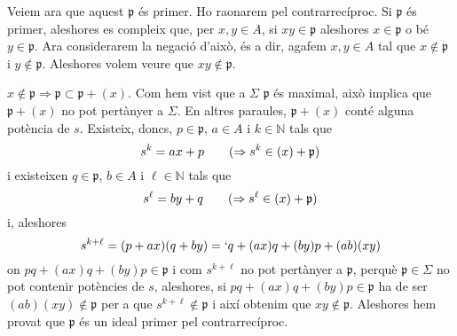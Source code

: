 \documentclass[../main.tex]{subfiles}
\begin{document}
\begin{sol}
\begin{enumerate}[(a)]
    Veiem ara que aquest $\mathfrak{p}$ és primer. Ho raonarem pel contrarrecíproc. Si $\mathfrak{p}$ és primer, aleshores es compleix que, per $x,y\in A$, si $xy\in\mathfrak{p}$ aleshores $x\in\mathfrak{p}$ o bé $y\in\mathfrak{p}$. Ara considerarem la negació d'això, és a dir, agafem $x,y\in A$ tal que $x\not\in \mathfrak{p}$ i $y\not\in\mathfrak{p}$. Aleshores volem veure que $xy\not\in\mathfrak{p}$.
    
    $x\not\in\mathfrak{p}\Rightarrow \mathfrak{p}\subset \mathfrak{p}+(x)$. Com hem vist que a $\Sigma$ $\mathfrak{p}$ és maximal, això implica que $\mathfrak{p}+(x)$ no pot pertànyer a $\Sigma$. En altres paraules, $\mathfrak{p}+(x)$ conté alguna potència de $s$. Existeix, doncs, $p\in\mathfrak{p}$, $a\in A$ i $k\in\mathbb{N}$ tals que
    \begin{equation}
        \notag
        s^k = ax+p \qquad (\Rightarrow s^k\in (x)+\mathfrak{p})
    \end{equation}
    i existeixen $q\in\mathfrak{p}$, $b\in A$ i $\ell\in\mathbb{N}$ tals que
    \begin{equation}
        \notag
        s^\ell = by+q \qquad (\Rightarrow s^\ell\in (x)+\mathfrak{p})
    \end{equation}
    i, aleshores
    \begin{equation}
        \notag
        s^{k+\ell} = (p+ax)(q+by) = `q+(ax)q+(by)p+(ab)(xy)
    \end{equation}
    on $pq+(ax)q+(by)p\in\mathfrak{p}$ i com $s^{k+\ell}$ no pot pertànyer a $\mathfrak{p}$, perquè $\mathfrak{p}\in \Sigma$ no pot contenir potències de $s$, aleshores, si $pq+(ax)q+(by)p\in\mathfrak{p}$ ha de ser $(ab)(xy)\not\in\mathfrak{p}$ per a que $s^{k+\ell}\not\in\mathfrak{p}$ i així obtenim que $xy\not\in\mathfrak{p}$. Aleshores hem provat que $\mathfrak{p}$ és un ideal primer pel contrarrecíproc.
\end{enumerate}
\end{sol}
\end{document}
